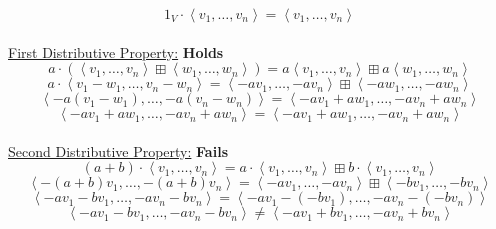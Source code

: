 \documentclass[12pt]{article}
\renewcommand{\vector}[1]{\left\langle{#1}\right\rangle}
\newcommand{\pars}[1]{\left( {#1} \right) }
\begin{document}
\begin{enumerate}
    $$1_V \cdot \vector{v_1, \dots, v_n} = \vector{v_1, \dots, v_n} $$
    \\
    \underline{First Distributive Property:} \textbf{Holds}
    $$a\cdot \pars{\vector{v_1,\dots, v_n} \boxplus \vector{w_1,\dots, w_n}} = a\vector{v_1,\dots, v_n} \boxplus a\vector{w_1,\dots, w_n}$$
    $$a \cdot \vector{v_1-w_1, \dots, v_n - w_n} = \vector{-av_1, \dots, -av_n} \boxplus \vector{-aw_1, \dots, -aw_n}$$
    $$\vector{-a(v_1-w_1), \dots, -a(v_n - w_n)} = \vector{-av_1 + aw_1, \dots, - av_n + aw_n}$$
    $$\vector{-av_1+aw_1, \dots, -av_n + aw_n} = \vector{-av_1 + aw_1, \dots, - av_n + aw_n}$$
    \\
    \underline{Second Distributive Property:} \textbf{Fails}
    $$(a+b)\cdot \vector{v_1, \dots, v_n} = a\cdot \vector{v_1, \dots, v_n} \boxplus b\cdot \vector{v_1, \dots, v_n}$$
    $$\vector{-(a+b)v_1, \dots, -(a+b)v_n} = \vector{-av_1, \dots, -av_n} \boxplus \vector{-bv_1, \dots, -bv_n}$$
    $$\vector{-av_1-bv_1, \dots, -av_n-bv_n} = \vector{-av_1 - (-bv_1), \dots, -av_n - (-bv_n)}$$
        $$\vector{-av_1-bv_1, \dots, -av_n-bv_n} \not= \vector{-av_1 +bv_1, \dots, -av_n + bv_n}$$
\vspace{0.4in}


\end{enumerate}
\end{document}

